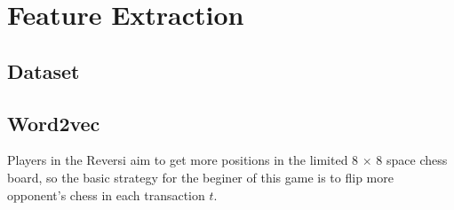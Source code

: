 \documentclass[10pt,twocolumn,letterpaper]{article}
\begin{document}
\section{Feature Extraction}
\subsection{Dataset}

%         
%
%
%
%
%	
%      

\subsection{Word2vec}

Players in the Reversi aim to get more positions in 
the limited 8 $\times$ 8 space chess board, so the 
basic strategy for the beginer of this game is to 
flip more opponent's chess in each transaction $t$.
\end{document}
